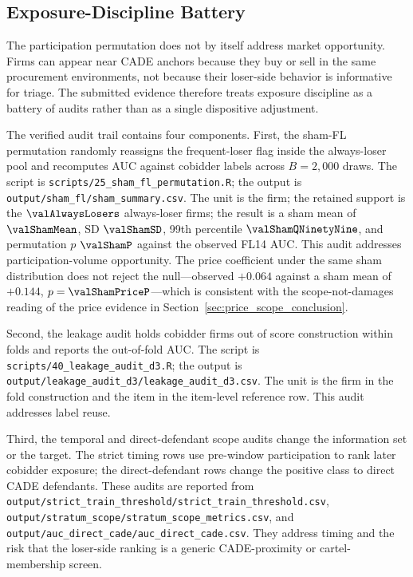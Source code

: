 \subsection{Exposure-Discipline Battery}
\label{app:market_opportunity_submission}

The participation permutation does not by itself address market
opportunity. Firms can appear near CADE anchors because they buy
or sell in the same procurement environments, not because their
loser-side behavior is informative for triage. The submitted
evidence therefore treats exposure discipline as a battery of
audits rather than as a single dispositive adjustment.

The verified audit trail contains four components. First, the
sham-FL permutation randomly reassigns the frequent-loser flag
inside the always-loser pool and recomputes AUC against
cobidder labels across $B=2{,}000$ draws. The script is
\texttt{scripts/25\_sham\_fl\_permutation.R}; the output is
\texttt{output/sham\_fl/sham\_summary.csv}. The unit is the firm;
the retained support is the $\valAlwaysLosers$ always-loser
firms; the result is a sham mean of $\valShamMean$, SD
$\valShamSD$, 99th percentile $\valShamQNinetyNine$, and
permutation $p$ $\valShamP$ against the observed FL14 AUC. This
audit addresses participation-volume opportunity. The price
coefficient under the same sham distribution does not reject the
null---observed $+0.064$ against a sham mean of $+0.144$,
$p=\valShamPriceP$---which is consistent with the scope-not-damages
reading of the price evidence in
Section~\ref{sec:price_scope_conclusion}.

Second, the leakage audit holds cobidder firms out of score
construction within folds and reports the out-of-fold AUC. The
script is \texttt{scripts/40\_leakage\_audit\_d3.R}; the output
is \texttt{output/leakage\_audit\_d3/leakage\_audit\_d3.csv}.
The unit is the firm in the fold construction and the item in
the item-level reference row. This audit addresses label reuse.

Third, the temporal and direct-defendant scope audits change the
information set or the target. The strict timing rows use
pre-window participation to rank later cobidder exposure; the
direct-defendant rows change the positive class to direct CADE
defendants. These audits are reported from
\texttt{output/strict\_train\_threshold/strict\_train\_threshold.csv},
\texttt{output/stratum\_scope/stratum\_scope\_metrics.csv}, and
\texttt{output/auc\_direct\_cade/auc\_direct\_cade.csv}. They
address timing and the risk that the loser-side ranking is a
generic CADE-proximity or cartel-membership screen.

